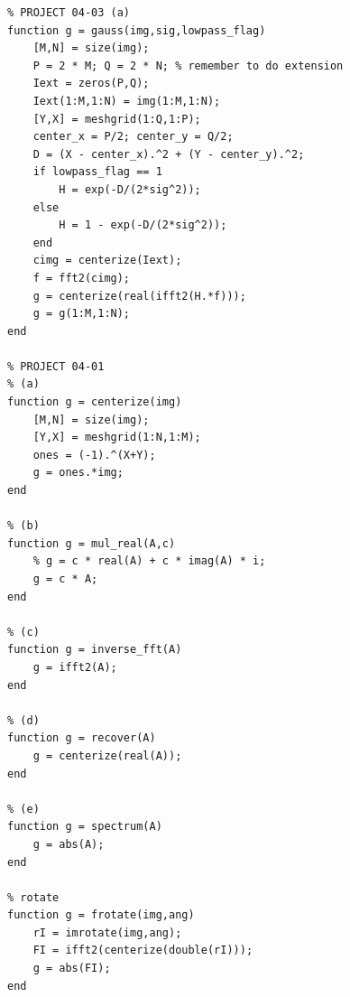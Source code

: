 \documentclass[logo,reportComp]{thesis}
\begin{document}
\begin{lstlisting}
% PROJECT 04-03 (a)
function g = gauss(img,sig,lowpass_flag)
	[M,N] = size(img);
	P = 2 * M; Q = 2 * N; % remember to do extension
	Iext = zeros(P,Q);
	Iext(1:M,1:N) = img(1:M,1:N);
	[Y,X] = meshgrid(1:Q,1:P);
    center_x = P/2; center_y = Q/2;
	D = (X - center_x).^2 + (Y - center_y).^2;
	if lowpass_flag == 1
		H = exp(-D/(2*sig^2));
	else
		H = 1 - exp(-D/(2*sig^2));
    end
	cimg = centerize(Iext);
	f = fft2(cimg);
	g = centerize(real(ifft2(H.*f)));
	g = g(1:M,1:N);
end

% PROJECT 04-01
% (a)
function g = centerize(img)
	[M,N] = size(img);
	[Y,X] = meshgrid(1:N,1:M);
	ones = (-1).^(X+Y);
	g = ones.*img;
end

% (b)
function g = mul_real(A,c)
	% g = c * real(A) + c * imag(A) * i;
	g = c * A;
end

% (c)
function g = inverse_fft(A)
	g = ifft2(A);
end

% (d)
function g = recover(A)
	g = centerize(real(A));
end

% (e)
function g = spectrum(A)
	g = abs(A);
end

% rotate
function g = frotate(img,ang)
	rI = imrotate(img,ang);
	FI = ifft2(centerize(double(rI)));
	g = abs(FI);
end
\end{lstlisting}
\end{document}
